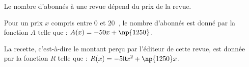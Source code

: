 \documentclass[10pt]{article}
\newcommand{\euro}{\eurologo{}}
\begin{document}
\setlength\parindent{0mm}
\pagestyle{fancy}
\thispagestyle{empty}
    
    
    




\medskip 
 
Le nombre d'abonnés à une revue dépend du prix de la revue.
 
Pour un prix $x$ compris entre 0 et 20~\euro, le nombre d'abonnés est donné par la fonction $A$ telle que : $A(x) = - 50 x + \np{1250}$.
 
La recette, c'est-à-dire le montant perçu par l'éditeur de cette revue, est donnée par la fonction $R$ telle que : $R(x) = - 50 x^2 + \np{1250} x$. 
\end{document}
